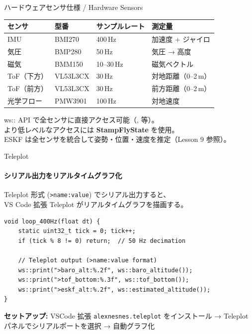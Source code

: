 \documentclass[aspectratio=169, 14pt]{beamer}
\begin{document}

\begin{frame}{ハードウェアセンサ仕様 / Hardware Sensors}
  \centering

  {\small
  \begin{tabular}{llll}
    \hline
    \textbf{センサ} & \textbf{型番} & \textbf{サンプルレート} & \textbf{測定量} \\
    \hline
    IMU        & BMI270  & 400\,Hz  & 加速度 + ジャイロ \\
    気圧       & BMP280  & 50\,Hz   & 気圧 → 高度 \\
    磁気       & BMM150  & 10--30\,Hz & 磁気ベクトル \\
    ToF（下方） & VL53L3CX & 30\,Hz  & 対地距離（0--2\,m） \\
    ToF（前方） & VL53L3CX & 30\,Hz  & 前方距離（0--2\,m） \\
    光学フロー  & PMW3901 & 100\,Hz  & 対地速度 \\
    \hline
  \end{tabular}
  }

  \vspace{1em}

  {\footnotesize
    ws:: API で全センサに直接アクセス可能（,  等）。\\
    より低レベルなアクセスには \textbf{StampFlyState} を使用。\\
    ESKF は全センサを統合して姿勢・位置・速度を推定（Lesson 9 参照）。
  }
\end{frame}

\begin{frame}[fragile]{Teleplot}
  \framesubtitle{シリアル出力をリアルタイムグラフ化}
  {\small Teleplot 形式 (\texttt{>name:value}) でシリアル出力すると、\\
  VS Code 拡張 Teleplot がリアルタイムグラフを描画する。}

  \vspace{0.3em}

  \begin{lstlisting}[style=sfcpp, basicstyle=\ttfamily\scriptsize]
void loop_400Hz(float dt) {
    static uint32_t tick = 0; tick++;
    if (tick % 8 != 0) return;  // 50 Hz decimation

    // Teleplot output (>name:value format)
    ws::print(">baro_alt:%.2f", ws::baro_altitude());
    ws::print(">tof_bottom:%.3f", ws::tof_bottom());
    ws::print(">eskf_alt:%.2f", ws::estimated_altitude());
}
  \end{lstlisting}

  \vspace{0.2em}
  {\footnotesize
    \textbf{セットアップ:} VSCode 拡張 \texttt{alexnesnes.teleplot} をインストール
    → Teleplot パネルでシリアルポートを選択 → 自動グラフ化
  }
\end{frame}
\end{document}
